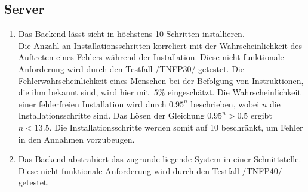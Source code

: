 \subsection*{Server}

\begin{samepage}
    \begin{enumerate}[label=\textbf{/NFP\arabic*0/}, align=left, start=3]
        \item \label{/NFP30/} Das \Gls{Backend} lässt sicht in höchstens 10 Schritten installieren. \\
              Die Anzahl an Installationsschritten korreliert mit der Wahrscheinlichkeit des Auftreten eines Fehlers während der Installation. Diese nicht funktionale Anforderung wird durch den Testfall \hyperref[/TNFP30/]{/TNFP30/} getestet.
              Die Fehlerwahrscheinlichkeit eines Menschen bei der Befolgung von Instruktionen, die ihm bekannt sind, wird hier mit $~5\%$ eingeschätzt.
              Die Wahrscheinlichkeit einer fehlerfreien Installation wird durch $0.95^n$ beschrieben, wobei $n$ die Installationsschritte sind.
              Das Lösen der Gleichung $0.95^n > 0.5$ ergibt $n < 13.5$. Die Installationsschritte werden somit auf 10 beschränkt, um Fehler in den Annahmen vorzubeugen.
        \item \label{/NFP40/} Das \Gls{Backend} abstrahiert das zugrunde liegende \Gls{System} in einer \Gls{Schnittstelle}. Diese nicht funktionale Anforderung wird durch den Testfall \hyperref[/TNFP40/]{/TNFP40/} getestet.
    \end{enumerate}
\end{samepage}
